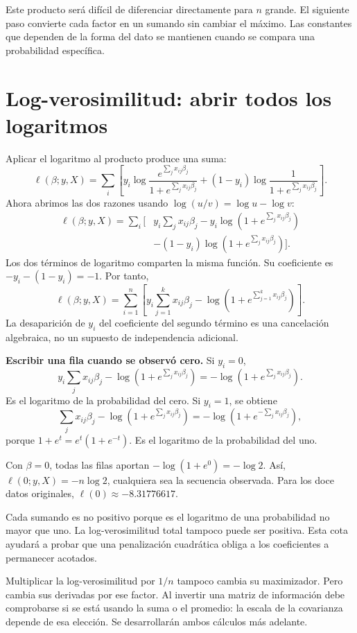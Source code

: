 \documentclass[11pt,a4paper]{article}
\begin{document}
Este producto será difícil de diferenciar directamente para $n$ grande.
El siguiente paso convierte cada factor en un sumando sin cambiar
el máximo. Las constantes que dependen de la forma del dato se
mantienen cuando se compara una probabilidad específica.

\clearpage
\section{Log-verosimilitud: abrir todos los logaritmos}\label{logit14}
Aplicar el logaritmo al producto produce una suma:
\[
\ell(\beta;y,X)=\sum_i\left[
y_i\log\frac{e^{\sum_jx_{ij}\beta_j}}{1+e^{\sum_jx_{ij}\beta_j}}
+(1-y_i)\log\frac1{1+e^{\sum_jx_{ij}\beta_j}}
\right].
\]
Ahora abrimos las dos razones usando $\log(u/v)=\log u-\log v$:
\[
\begin{aligned}
\ell(\beta;y,X)
=\sum_i\bigg[&
y_i\sum_jx_{ij}\beta_j
-y_i\log(1+e^{\sum_jx_{ij}\beta_j})\\
&-(1-y_i)\log(1+e^{\sum_jx_{ij}\beta_j})\bigg].
\end{aligned}
\]
Los dos términos de logaritmo comparten la misma función.
Su coeficiente es $-y_i-(1-y_i)=-1$. Por tanto,
\[
\boxed{\ell(\beta;y,X)=
\sum_{i=1}^n\left[
y_i\sum_{j=1}^kx_{ij}\beta_j-
\log(1+e^{\sum_{j=1}^kx_{ij}\beta_j})\right]}.
\]
La desaparición de $y_i$ del coeficiente del segundo término es
una cancelación algebraica, no un supuesto de independencia adicional.

\textbf{Escribir una fila cuando se observó cero.}
Si $y_i=0$,
\[
y_i\sum_jx_{ij}\beta_j-\log(1+e^{\sum_jx_{ij}\beta_j})
=-\log(1+e^{\sum_jx_{ij}\beta_j}).
\]
Es el logaritmo de la probabilidad del cero.
Si $y_i=1$, se obtiene
\[
\sum_jx_{ij}\beta_j-\log(1+e^{\sum_jx_{ij}\beta_j})
=-\log(1+e^{-\sum_jx_{ij}\beta_j}),
\]
porque $1+e^t=e^t(1+e^{-t})$. Es el logaritmo de la probabilidad del uno.

\begin{ejemplo}
Con $\beta=0$, todas las filas aportan
$-\log(1+e^0)=-\log2$. Así,
$\ell(0;y,X)=-n\log2$, cualquiera sea la secuencia observada.
Para los doce datos originales, $\ell(0)\approx-8.31776617$.
\end{ejemplo}
Cada sumando es no positivo porque es el logaritmo de una probabilidad
no mayor que uno. La log-verosimilitud total tampoco puede ser positiva.
Esta cota ayudará a probar que una penalización cuadrática
obliga a los coeficientes a permanecer acotados.

Multiplicar la log-verosimilitud por $1/n$ tampoco cambia su maximizador.
Pero cambia sus derivadas por ese factor.
Al invertir una matriz de información debe comprobarse si se está
usando la suma o el promedio: la escala de la covarianza depende
de esa elección. Se desarrollarán ambos cálculos más adelante.
\end{document}
